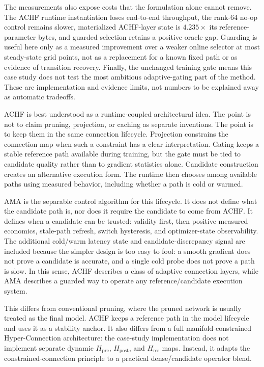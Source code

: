\documentclass{article}
\newcommand{\achf}{\textsc{ACHF}}
\newcommand{\ama}{\textsc{AMA}}
\begin{document}
The measurements also expose costs that the formulation alone cannot remove.
The ACHF runtime instantiation loses end-to-end throughput, the rank-64 no-op
control remains slower, materialized ACHF-layer state is $4.235\times$ its
reference-parameter bytes, and guarded selection retains a positive oracle
gap. Guarding is useful here only as a measured improvement over a weaker
online selector at most steady-state grid points, not as a replacement for a
known fixed path or as evidence of transition recovery. Finally, the unchanged
training gate means this case study does not test the most ambitious
adaptive-gating part of the method. These are implementation and evidence
limits, not numbers to be explained away as automatic tradeoffs.

\achf{} is best understood as a runtime-coupled architectural idea. The point
is not to claim pruning, projection, or caching as separate inventions. The
point is to keep them in the same connection lifecycle. Projection constrains the
connection map when such a constraint has a clear interpretation. Gating keeps
a stable reference path available during training, but the gate must be tied to
candidate quality rather than to gradient statistics alone. Candidate
construction creates an alternative execution form. The runtime then chooses
among available paths using measured behavior, including whether a path is cold
or warmed.

\ama{} is the separable control algorithm for this lifecycle. It does not
define what the candidate path is, nor does it require the candidate to come
from ACHF. It defines when a candidate can be trusted: validity first, then
positive measured economics, stale-path refresh, switch hysteresis, and
optimizer-state observability. The additional cold/warm latency state and
candidate-discrepancy signal are included because the simpler design is too
easy to fool: a smooth gradient does not prove a candidate is accurate, and a
single cold probe does not prove a path is slow. In this sense, ACHF describes a
class of adaptive connection layers, while \ama{} describes a guarded way to
operate any reference/candidate execution system.

This differs from conventional pruning, where the pruned network is usually
treated as the final model. \achf{} keeps a reference path in the model
lifecycle and uses it as a stability anchor. It also differs from a full
manifold-constrained Hyper-Connection architecture: the case-study
implementation does not implement separate dynamic $H_{\mathrm{pre}}$,
$H_{\mathrm{post}}$, and $H_{\mathrm{res}}$ maps. Instead, it adapts the
constrained-connection principle to a practical dense/candidate operator blend.
\end{document}
